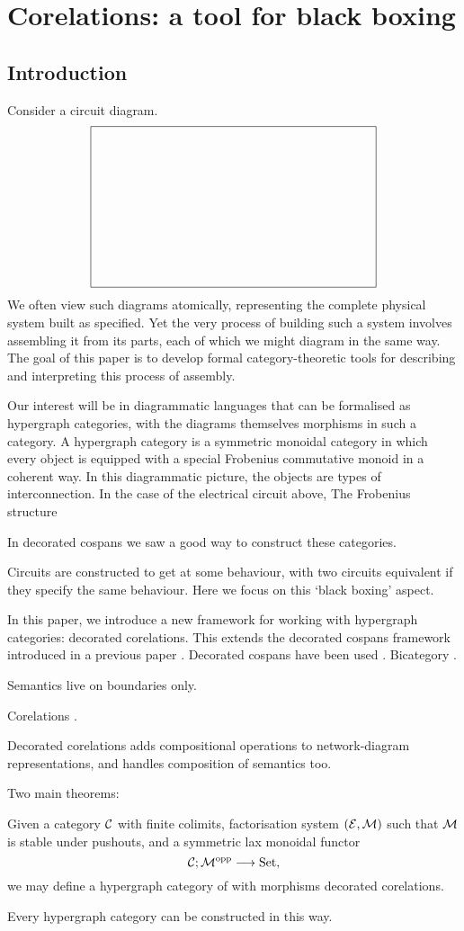 \chapter[Corelations]{Corelations: a tool for black boxing}

\section{Introduction}

Consider a circuit diagram.
\[
  \begin{tikzpicture}
    \draw (0,0) -- (0,4.5) -- (8,4.5) -- (8,0) -- (0,0);
  \end{tikzpicture}
\]
We often view such diagrams atomically, representing the complete physical
system built as specified. Yet the very process of building such a system
involves assembling it from its parts, each of which we might diagram in the
same way. The goal of this paper is to develop formal category-theoretic tools
for describing and interpreting this process of assembly.

Our interest will be in diagrammatic languages that can be formalised as
hypergraph categories, with the diagrams themselves morphisms in such a
category. A hypergraph category is a symmetric monoidal category in which every
object is equipped with a special Frobenius commutative monoid in a coherent
way. In this diagrammatic picture, the objects are types of interconnection. In
the case of the electrical circuit above, The Frobenius structure

In decorated cospans we saw a good way to construct these categories.

Circuits are constructed to get at some behaviour, with two circuits equivalent
if they specify the same behaviour. Here we focus on this `black boxing' aspect.



In this paper, we introduce a new framework for working with hypergraph
categories: decorated corelations. This extends the decorated cospans framework
introduced in a previous paper \cite{F}. Decorated cospans have been
used \cite{BF, BFP, Po}. Bicategory \cite{Co}.

Semantics live on boundaries only.

Corelations \cite{CF}.

Decorated corelations adds compositional operations to network-diagram
representations, and handles composition of semantics too. 

Two main theorems: 
\begin{theorem}
Given a category $\mathcal C$ with finite colimits, factorisation system $(\mathcal E,\mathcal
M)$ such that $\mathcal M$ is stable under pushouts, and a symmetric lax monoidal functor 
\[
  \mathcal C; \mathcal M^{\mathrm{opp}} \longrightarrow \mathrm{Set},
\]
we may define a hypergraph category of with morphisms decorated corelations.
\end{theorem}
\begin{theorem}
Every hypergraph category can be constructed in this way.
\end{theorem}

